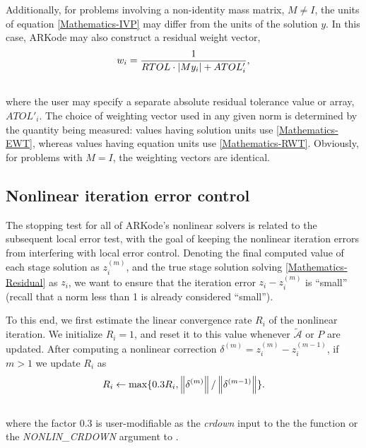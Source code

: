 \documentclass[letterpaper,10pt,english]{sphinxmanual}
\begin{document}
Additionally, for problems involving a non-identity mass matrix,
$M\ne I$, the units of equation \eqref{Mathematics-IVP} may differ from the
units of the solution $y$.  In this case, ARKode may also
construct a residual weight vector,
\label{Mathematics:equation-RWT}\begin{gather}
\begin{split}w_i = \frac{1}{RTOL\cdot |My_i| + ATOL'_i},\end{split}\label{Mathematics-RWT}\\\begin{split}\end{split}\notag
\end{gather}
where the user may specify a separate absolute residual tolerance
value or array, $ATOL'_i$.  The choice of weighting vector used
in any given norm is determined by the quantity being measured: values
having solution units use \eqref{Mathematics-EWT}, whereas values having equation
units use \eqref{Mathematics-RWT}.  Obviously, for problems with $M=I$, the
weighting vectors are identical.


\subsection{Nonlinear iteration error control}
\label{Mathematics:nonlinear-iteration-error-control}\label{Mathematics:mathematics-error-nonlinear}
The stopping test for all of ARKode's nonlinear solvers is related to
the subsequent local error test, with the goal of keeping the
nonlinear iteration errors from interfering with local error control.
Denoting the final computed value of each stage solution as
$z_i^{(m)}$, and the true stage solution solving \eqref{Mathematics-Residual}
as $z_i$, we want to ensure that the iteration error
$z_i - z_i^{(m)}$ is ``small'' (recall that a norm less than 1 is
already considered ``small'').

To this end, we first estimate the linear convergence rate $R_i$
of the nonlinear iteration.  We initialize $R_i=1$, and reset it
to this value whenever $\tilde{\mathcal A}$ or $P$ are
updated.  After computing a nonlinear correction $\delta^{(m)} =
z_i^{(m)} - z_i^{(m-1)}$, if $m>1$ we update $R_i$ as
\begin{gather}
\begin{split}R_i \leftarrow \max\{ 0.3 R_i, \left\|\delta^{(m)}\right\| / \left\|\delta^{(m-1)}\right\| \}.\end{split}\notag\\\begin{split}\end{split}\notag
\end{gather}
where the factor 0.3 is user-modifiable as the \emph{crdown} input to the
the function {\hyperref[c_interface/User_callable:ARKodeSetNonlinCRDown]{}} or the \emph{NONLIN\_CRDOWN}
argument to {\hyperref[f_interface/Usage:f/_/FARKSETRIN]{}}.
\end{document}
